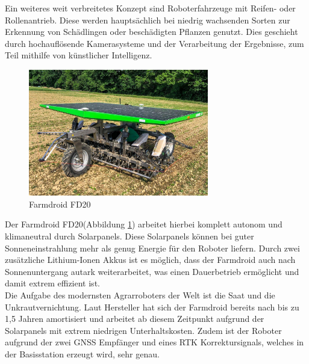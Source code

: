 Ein weiteres weit verbreitetes Konzept sind Roboterfahrzeuge mit Reifen- oder
Rollenantrieb. Diese werden hauptsächlich bei niedrig wachsenden Sorten zur
Erkennung von Schädlingen oder beschädigten Pflanzen genutzt. Dies geschieht
durch hochauflösende Kamerasysteme und der Verarbeitung der Ergebnisse, zum
Teil mithilfe von künstlicher Intelligenz.

\begin{figure}[h]
	\centering
	\includegraphics[width=0.7\textwidth]{bilder/farmdroid_fd20.png}
	\caption[Farmdroid FD20]{Farmdroid FD20 \cite{Wurst}}
	\label{fig:farmdroid_fd20}
\end{figure}

Der Farmdroid FD20(Abbildung \ref{fig:farmdroid_fd20}) arbeitet hierbei komplett autonom und klimaneutral durch
Solarpanels. Diese Solarpanels können bei guter Sonneneinstrahlung mehr als
genug Energie für den Roboter liefern. Durch zwei zusätzliche Lithium-Ionen
Akkus ist es möglich, dass der Farmdroid auch nach Sonnenuntergang autark
weiterarbeitet, was einen Dauerbetrieb ermöglicht und damit extrem effizient
ist.\cite{jungwirth2022arbeitszeitbedarf}\\ Die Aufgabe des modernsten
Agrarroboters der Welt\cite{donaukurier2022} ist die Saat und die
Unkrautvernichtung. Laut Hersteller hat sich der Farmdroid bereits nach bis zu
1,5 Jahren amortisiert und arbeitet ab diesem Zeitpunkt aufgrund der
Solarpanels mit extrem niedrigen Unterhaltskosten. Zudem ist der Roboter
aufgrund der zwei GNSS Empfänger und eines RTK Korrektursignals, welches in der
Basisstation erzeugt wird, sehr genau.\cite{jungwirth2022arbeitszeitbedarf}\cite{spykman2023wirtschaftlichkeitsbewertung}